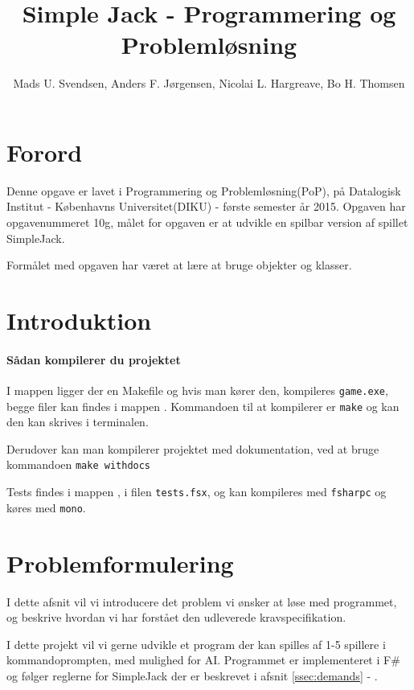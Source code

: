 \documentclass[a4paper]{article}
\title{Simple Jack - Programmering og Problemløsning}
\author{Mads U. Svendsen, Anders F. Jørgensen, Nicolai L. Hargreave, Bo H. Thomsen}
\begin{document}
	\maketitle %
        
  \tableofcontents

\section{Forord}
  Denne opgave er lavet i Programmering og Problemløsning(PoP),
    på Datalogisk Institut - Københavns Universitet(DIKU) - første semester år 2015.
    Opgaven har opgavenummeret 10g, målet for opgaven er at
    udvikle en spilbar version af spillet SimpleJack.

  Formålet med opgaven har været at lære at bruge objekter og klasser.

\newpage
    
\section{Introduktion} \label{sec:introduction}
  \paragraph*{Sådan kompilerer du projektet\\}
  I  mappen ligger der en Makefile og hvis man kører den, 
  kompileres \lstinline$game.exe$,
  begge filer kan findes i mappen .
  Kommandoen til at kompilerer er  \lstinline$make$ og kan den kan skrives i terminalen.

  Derudover kan man kompilerer projektet med dokumentation, ved at bruge kommandoen \lstinline$make withdocs$

  Tests findes i  mappen , i filen \lstinline$tests.fsx$,
  og kan kompileres med \lstinline$fsharpc$ og køres med \lstinline$mono$.

\section{Problemformulering} \label{sec:problem}
  I dette afsnit vil vi introducere det problem vi ønsker at løse med programmet,
  og beskrive hvordan vi har forstået den udleverede kravspecifikation.

  I dette projekt vil vi gerne udvikle et program der kan spilles af 1-5 spillere i kommandoprompten,
  med mulighed for AI. Programmet er implementeret i F\# og følger reglerne for SimpleJack der er beskrevet i afsnit \ref{ssec:demands} - .
\end{document}
